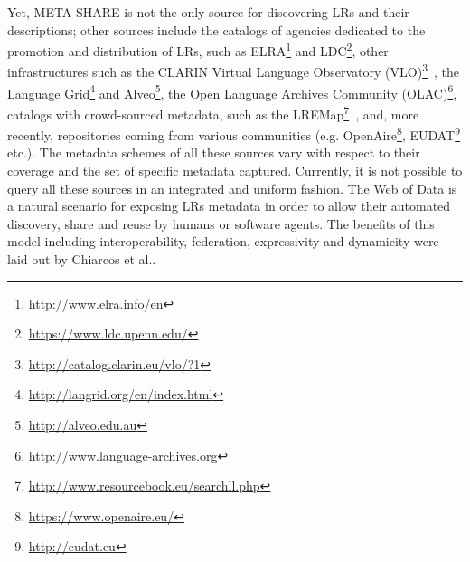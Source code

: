 \documentclass{llncs}
\begin{document}
Yet, META-SHARE is not the only source for discovering LRs and their descriptions; other sources include the catalogs of agencies dedicated to the promotion and distribution of LRs, such as ELRA\footnote{\url{http://www.elra.info/en}} and LDC\footnote{\url{https://www.ldc.upenn.edu/}}, other infrastructures such as the CLARIN Virtual Language Observatory (VLO)\footnote{\url{http://catalog.clarin.eu/vlo/?1}}~\cite{broeder2010data}, 
the Language Grid\footnote{\url{http://langrid.org/en/index.html}} and Alveo\footnote{\url{http://alveo.edu.au}}, the Open Language Archives Community (OLAC)\footnote{\url{http://www.language-archives.org}}, 
catalogs with crowd-sourced metadata, such as the LREMap\footnote{\url{http://www.resourcebook.eu/searchll.php}}~\cite{calzolari2012lre}, and, more recently, repositories coming from various communities (e.g. OpenAire\footnote{\url{https://www.openaire.eu/}}, EUDAT\footnote{\url{http://eudat.eu}} etc.). 
The metadata schemes of all these sources vary with respect to their coverage and the set of specific metadata captured.
Currently, it is not possible to query all these sources in an integrated and uniform fashion.
The Web of Data is a natural scenario for exposing LRs metadata in order to allow their automated discovery, share and reuse by humans or software agents. The benefits of this model including interoperability, federation, expressivity and dynamicity were laid out by Chiarcos et al.\cite{chiarcos2012towards}.
\end{document}
